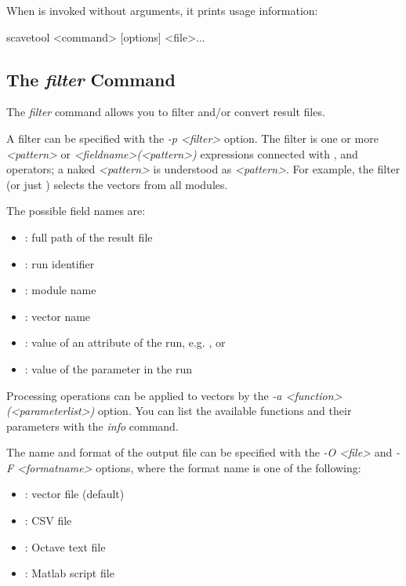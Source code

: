 When  is invoked without arguments, it prints usage information:

\begin{commandline}
scavetool <command> [options] <file>...
\end{commandline}

\subsection{The \textit{filter} Command}

The \textit{filter} command allows you to filter and/or convert result files.

A filter can be specified with the \textit{-p <filter>} option.
The filter is one or more \textit{<pattern>} or \textit{<fieldname>(<pattern>)}
expressions connected with ,  and  operators;
a naked \textit{<pattern>} is understood as \textit{<pattern>}\ttt{)}.
For example, the filter  (or just
) selects the  vectors from all
 modules.

The possible field names are:

\begin{itemize}
    \item{}: full path of the result file
    \item{}: run identifier
    \item{}: module name
    \item{}: vector name
    \item{}: value of an attribute of the run,
        e.g. ,  or 
    \item{}: value of the parameter in the run
\end{itemize}

Processing operations can be applied to vectors by the
\textit{-a <function>(<parameterlist>)} option. You can list
the available functions and their parameters with the \textit{info} command.

The name and format of the output file can be specified with the
\textit{-O <file>} and \textit{-F <formatname>} options, where
the format name is one of the following:

\begin{itemize}
    \item{}: vector file (default)
    \item{}: CSV file
    \item{}: Octave text file
    \item{}: Matlab script file
\end{itemize}

